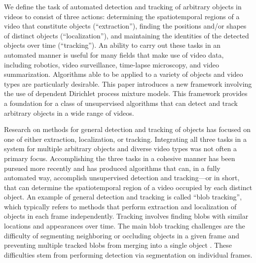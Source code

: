 \documentclass[twocolumn, final]{svjour3}
\begin{document}
We define the task of automated detection and tracking of arbitrary objects in videos to consist of three actions: determining the spatiotemporal regions of a video that constitute objects (``extraction''), finding the positions and/or shapes of distinct objects (``localization''), and maintaining the identities of the detected objects over time (``tracking''). An ability to carry out these tasks in an automated manner is useful for many fields that make use of video data, including robotics, video surveillance, time-lapse microscopy, and video summarization. Algorithms able to be applied to a variety of objects and video types are particularly desirable. This paper introduces a new framework involving the use of dependent Dirichlet process mixture models. This framework provides a foundation for a class of unsupervised algorithms that can detect and track arbitrary objects in a wide range of videos.

Research on methods for general detection and tracking of objects has focused on one of either extraction, localization, or tracking. Integrating all three tasks in a system for multiple arbitrary objects and diverse video types was not often a primary focus. Accomplishing the three tasks in a cohesive manner has been pursued more recently and has produced algorithms that can, in a fully automated way, accomplish unsupervised detection and tracking---or in short, that can determine the spatiotemporal region of a video occupied by each distinct object. An example of general detection and tracking is called ``blob tracking'', which typically refers to methods that perform extraction and localization of objects in each frame independently. Tracking involves finding blobs with similar locations and appearances over time. The main blob tracking challenges are the difficulty of segmenting neighboring or occluding objects in a given frame \cite{zhao2004tracking} and preventing multiple tracked blobs from merging into a single object \cite{vermaak_2003}. These difficulties stem from performing detection via segmentation on individual frames.
\end{document}
